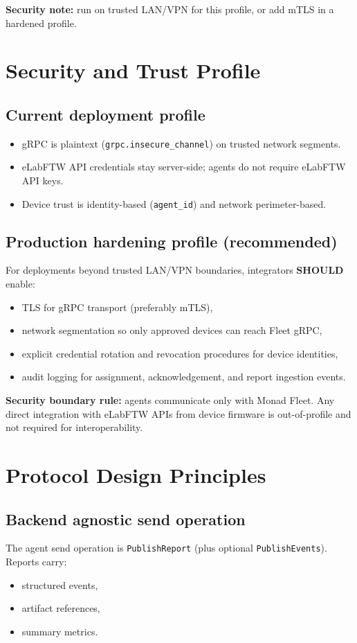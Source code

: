 \documentclass[11pt,a4paper]{article}
\begin{document}
\textbf{Security note:} run on trusted LAN/VPN for this profile, or add mTLS in a hardened profile.

\section{Security and Trust Profile}
\subsection{Current deployment profile}
\begin{itemize}
  \item gRPC is plaintext (\texttt{grpc.insecure\_channel}) on trusted network segments.
  \item eLabFTW API credentials stay server-side; agents do not require eLabFTW API keys.
  \item Device trust is identity-based (\texttt{agent\_id}) and network perimeter-based.
\end{itemize}

\subsection{Production hardening profile (recommended)}
For deployments beyond trusted LAN/VPN boundaries, integrators \textbf{SHOULD} enable:
\begin{itemize}
  \item TLS for gRPC transport (preferably mTLS),
  \item network segmentation so only approved devices can reach Fleet gRPC,
  \item explicit credential rotation and revocation procedures for device identities,
  \item audit logging for assignment, acknowledgement, and report ingestion events.
\end{itemize}

\textbf{Security boundary rule:}
agents communicate only with Monad Fleet.
Any direct integration with eLabFTW APIs from device firmware is out-of-profile and not required for interoperability.

\section{Protocol Design Principles}
\subsection{Backend agnostic send operation}
The agent send operation is \texttt{PublishReport} (plus optional \texttt{PublishEvents}).
Reports carry:
\begin{itemize}
  \item structured events,
  \item artifact references,
  \item summary metrics.
\end{itemize}
\end{document}
